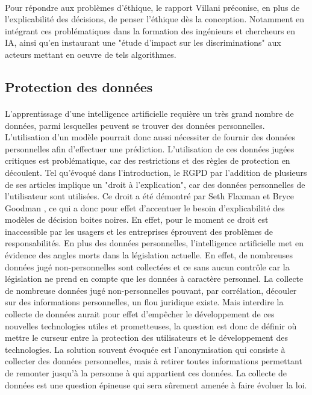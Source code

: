 \paragraph{}Pour répondre aux problèmes d'éthique, le rapport Villani préconise, en plus de l'explicabilité des décisions, de penser l'éthique dès la conception. Notamment en intégrant ces problématiques dans la formation des ingénieurs et chercheurs en IA, ainsi qu'en instaurant une "étude d’impact sur les discriminations" aux acteurs mettant en oeuvre de tels algorithmes.

\subsection{Protection des données}
\paragraph{}L'apprentissage d'une intelligence artificielle requière un très grand nombre de données, parmi lesquelles peuvent se trouver des données personnelles. L'utilisation d'un modèle pourrait donc aussi nécessiter de fournir des données personnelles afin d'effectuer une prédiction. L'utilisation de ces données jugées critiques est problématique, car des restrictions et des règles de protection en découlent. Tel qu'évoqué dans l'introduction, le RGPD par l'addition de plusieurs de ses articles implique un "droit à l'explication", car des données personnelles de l'utilisateur sont utilisées. Ce droit a été démontré par Seth Flaxman et Bryce Goodman \cite{RGPDexplanRight}, ce qui a donc pour effet d'accentuer le besoin d'explicabilité des modèles de décision boites noires. En effet, pour le moment ce droit est inaccessible par les usagers et les entreprises éprouvent des problèmes de responsabilités. En plus des données personnelles, l'intelligence artificielle met en évidence des angles morts dans la législation actuelle. En effet, de nombreuses données jugé non-personnelles sont collectées et ce sans aucun contrôle car la législation ne prend en compte que les données à caractère personnel. La collecte de nombreuse données jugé non-personnelles pouvant, par corrélation, découler sur des informations personnelles, un flou juridique existe. Mais interdire la collecte de données aurait pour effet d'empêcher le développement de ces nouvelles technologies utiles et prometteuses, la question est donc de définir où mettre le curseur entre la protection des utilisateurs et le développement des technologies. La solution souvent évoquée est l'anonymisation qui consiste à collecter des données personnelles, mais à retirer toutes informations permettant de remonter jusqu'à la personne à qui appartient ces données. La collecte de données est une question épineuse qui sera sûrement amenée à faire évoluer la loi.

